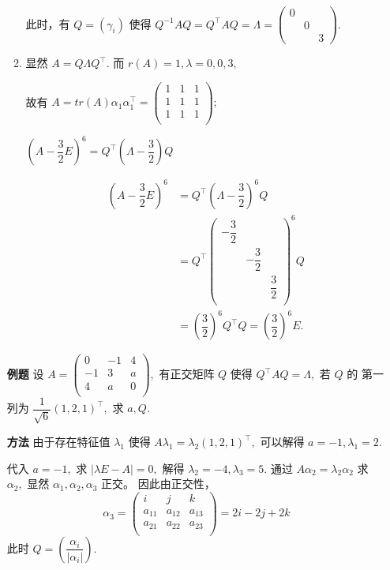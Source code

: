 \begin{itemize}
\begin{enumerate}[label = \Roman*.]
        此时，有 $ Q = (\gamma_i) $ 使得 $ Q^{-1}AQ = Q^\top AQ = \Lambda = \begin{pmatrix}
            0&&\\&0&\\&&3
        \end{pmatrix}. $ 
        \item 显然 $ A = Q\Lambda Q^\top. $ 而 $ r(A) = 1, \lambda = 0,0,3, $ 
        
        故有 $ A = tr(A)\alpha_1\alpha_1^\top = \begin{pmatrix}
        1&1&1\\1&1&1\\1&1&1\\    
        \end{pmatrix}; $ 

        $ (A - \dfrac{3}{2}E)^6 = Q^\top(\Lambda-\dfrac{3}{2})Q $ 

        \begin{equation*}
            \begin{aligned}
                (A - \dfrac{3}{2}E)^6 &= Q^\top(\Lambda-\dfrac{3}{2})^6Q \\ 
                &= Q^\top\begin{pmatrix}
                    -\dfrac{3}{2}&&\\&-\dfrac{3}{2}&\\&&\dfrac{3}{2}\\
                \end{pmatrix}^6 Q
                \\&= (\dfrac{3}{2})^6Q^\top Q = (\dfrac{3}{2})^6 E.
            \end{aligned}
        \end{equation*}
    \end{enumerate}
\end{itemize}

\begin{itemize}
    \item[\textbf{例题}] 设 $ A = \begin{pmatrix}
        0&-1&4\\-1&3&a\\4&a&0\\
    \end{pmatrix}, $ 有正交矩阵 $ Q $ 使得 $ Q^\top AQ = \Lambda, $ 若 $ Q $ 的
    第一列为 $ \dfrac{1}{\sqrt 6}(1,2,1)^\top, $ 求 $ a,Q. $ 
    \item[\textbf{方法}] 由于存在特征值 $ \lambda_1 $ 使得 $ A\lambda_1 = \lambda_2(1,2,1)^\top, $ 
    可以解得 $ a = -1,\lambda_1 = 2. $ 

    代入 $ a = -1, $ 求 $ |\lambda E - A| = 0, $ 解得 $ \lambda_2 = -4,\lambda_3 = 5. $ 
    通过 $ A\alpha_2 = \lambda_2\alpha_2 $ 求 $ \alpha_2, $ 显然 $ \alpha_1,\alpha_2,\alpha_3 $ 正交。
    因此由正交性，$$
        \alpha_3 = \begin{pmatrix}
            i&j&k\\ a_{11}&a_{12}&a_{13}\\a_{21}&a_{22}&a_{23}\\
        \end{pmatrix} = 2i-2j+2k
    $$
    此时 $ Q = \left(\dfrac{\alpha_i}{|\alpha_i|}\right). $ 
\end{itemize}